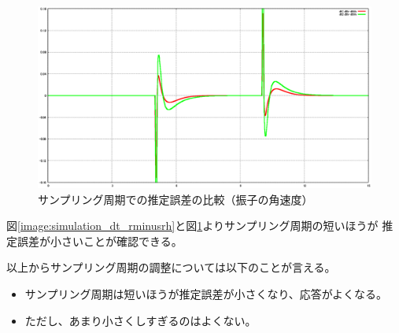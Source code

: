 	\begin{figure}[H]
		\centering
		\includegraphics[width=0.8\linewidth]{gazo/simulation_dt_compare_THETAminusTHETAH.eps}
		\caption{サンプリング周期での推定誤差の比較（振子の角速度）}
		\label{image:simulation_dt_thetaminusthetah}
	\end{figure}
	図\ref{image:simulation_dt_rminusrh}と図\ref{image:simulation_dt_thetaminusthetah}よりサンプリング周期の短いほうが
	推定誤差が小さいことが確認できる。
	\par
	以上からサンプリング周期の調整については以下のことが言える。
	\begin{itemize}
	  \item サンプリング周期は短いほうが推定誤差が小さくなり、応答がよくなる。
	  \item ただし、あまり小さくしすぎるのはよくない。
	\end{itemize}
	
